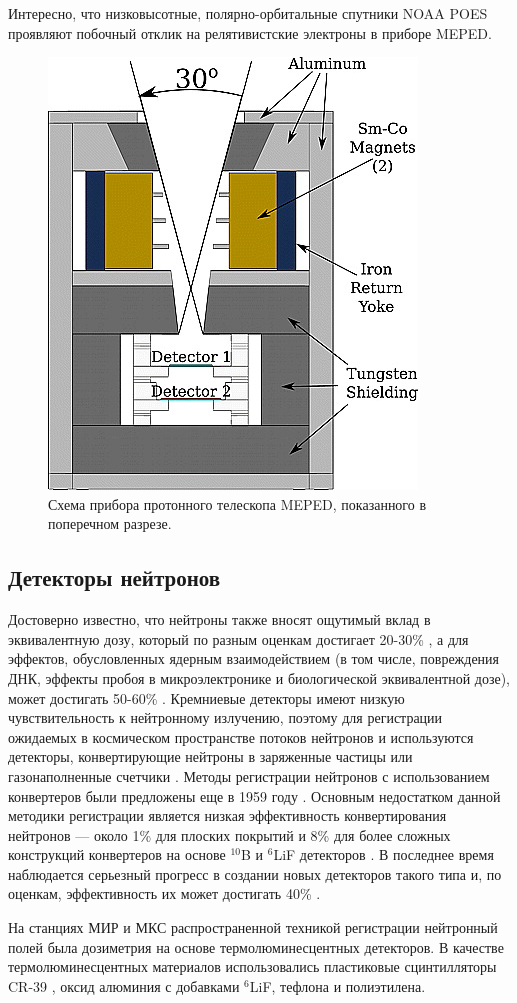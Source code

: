 Интересно, что низковысотные, полярно-орбитальные спутники NOAA POES проявляют побочный отклик на релятивистские электроны в приборе MEPED\cite{Yando2011}.
\begin{figure}
	\centering
	\includegraphics[width=0.3\linewidth]{images/jgra21383-fig-0002}
	\caption{Схема прибора протонного телескопа MEPED, показанного в поперечном разрезе.\cite{Yando2011}}
	\label{fig:jgra21383-fig-0002}
\end{figure}


\subsection{Детекторы нейтронов} \label{subsect1_3_1}


Достоверно известно, что нейтроны также вносят ощутимый вклад в эквивалентную дозу, который по разным оценкам достигает 20-30\% \cite{Dudkin1990}, а для эффектов, обусловленных ядерным взаимодействием (в том числе, повреждения ДНК, эффекты пробоя в микроэлектронике и биологической эквивалентной дозе), может достигать 50-60\% \cite{Armstrong2001} \cite{Benton2001}. Кремниевые детекторы имеют низкую чувствительность к нейтронному излучению, поэтому для регистрации ожидаемых в космическом пространстве потоков нейтронов \cite{Esteban2016} и используются детекторы, конвертирующие нейтроны в заряженные частицы или газонаполненные счетчики \cite{Stozhkov2007}. Методы регистрации нейтронов с использованием конвертеров были предложены еще в 1959 году \cite{McGregor2013}. Основным недостатком данной методики регистрации является низкая эффективность конвертирования нейтронов --- около 1\% для плоских покрытий и 8\% для более сложных конструкций конвертеров на основе $ ^{10}$B и $ ^6$LiF детекторов \cite{Mendicino2015}. В последнее время наблюдается серьезный прогресс в создании новых детекторов такого типа и, по оценкам, эффективность их может достигать 40\% \cite{McGregor2013}. 

На станциях МИР и МКС распространенной техникой регистрации нейтронный полей была дозиметрия на основе термолюминесцентных детекторов. В качестве термолюминесцентных материалов использовались пластиковые сцинтилляторы CR-39 \cite{Alberts1991}, оксид алюминия с добавками $ ^6$LiF, тефлона и полиэтилена\cite{Kulkarni2011}.

